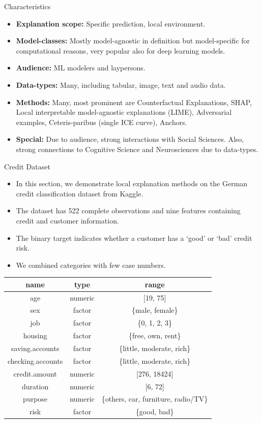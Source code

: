 \documentclass[11pt,compress,t,notes=noshow, xcolor=table]{beamer}
\begin{document}
\begin{vbframe}{Characteristics}
	\begin{itemize}
		\item \textbf{Explanation scope:} Specific prediction, local environment.
		\item \textbf{Model-classes:} Mostly model-agnostic in definition but model-specific for computational reasons, very popular also for deep learning models.
		\item \textbf{Audience:} ML modelers and laypersons.
		\item \textbf{Data-types:} Many, including tabular, image, text and audio data.
		\item \textbf{Methods:} Many, most prominent are Counterfactual Explanations, SHAP, Local interpretable model-agnostic explanations (LIME), Adversarial examples, Ceteris-paribus (single ICE curve), Anchors.
		\item \textbf{Special:} Due to audience, strong interactions with Social Sciences. Also, strong connections to Cognitive Science and Neurosciences due to data-types.
	\end{itemize}
\end{vbframe}

\begin{vbframe}{Credit Dataset}

	\begin{itemize}
		\item In this section, we demonstrate local explanation methods on the German credit classification dataset from Kaggle. \href{https://www.kaggle.com/uciml/german-credit}{}
		\item The dataset has 522 complete observations and nine features containing credit and customer information.
		\item The binary target indicates whether a customer has a `good' or `bad' credit risk.  
		\item We combined categories with few case numbers. 
	\end{itemize}
		\begin{center}
			\footnotesize
			\begin{tabular}{ccc}
				\hline
				name & type & range\\
				\hline
				age & numeric & [19, 75]\\
				sex & factor & \{male, female\}\\
				job & factor & \{0, 1, 2, 3\}\\
				housing & factor & \{free, own, rent\}\\
				saving.accounts & factor & \{little, moderate, rich\}\\
				checking.accounts & factor & \{little, moderate, rich\}\\
				credit.amount & numeric & [276, 18424]\\
				duration & numeric &  [6, 72]\\
				purpose & numeric &  \{others, car, furniture, radio/TV\}\\
				risk & factor & \{good, bad\}
			\end{tabular}
		\end{center}
\end{vbframe}
\end{document}
